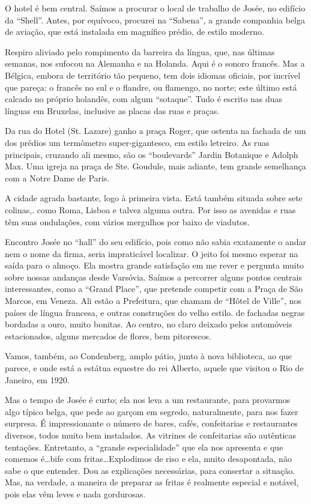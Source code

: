 O hotel é bem central. Saímos a procurar o local de trabalho de Josée, no edifício da ``Shell''. Antes, por equívoco, procurei na ``Sabena'', a grande companhia belga de aviação, que está instalada em magnífico prédio, de estilo moderno.

Respiro aliviado pelo rompimento da barreira da língua, que, nas últimas semanas, nos sufocou na Alemanha e na Holanda. Aqui é o sonoro francês. Mas a Bélgica, embora de território tão pequeno, tem dois idiomas oficiais, por incrível que pareça: o francês no sul e o flandre, ou flamengo, no norte; este último está calcado no próprio holandês, com algum ``sotaque''. Tudo é escrito nas duas línguas em Bruxelas, inclusive as placas das ruas e praças.

Da rua do Hotel (St. Lazare) ganho a praça Roger, que ostenta na fachada de um dos prédios um termômetro super-gigantesco, em estilo letreiro. As ruas principais, cruzando ali mesmo, são os ``boulevards'' Jardin Botanique e Adolph Max. Uma igreja na praça de Ste. Goudule, mais adiante, tem grande semelhança com a Notre Dame de Paris.

A cidade agrada bastante, logo à primeira vista. Está também situada sobre sete colinas,. como Roma, Lisboa e talvez alguma outra. Por isso as avenidas e ruas têm suas ondulações, com vários mergulhos por baixo de viadutos.

Encontro Josée no ``hall'' do seu edifício, pois como não sabia exatamente o andar nem o nome da firma, seria impraticável localizar. O jeito foi mesmo esperar na saída para o almoço. Ela mostra grande satisfação em me rever e pergunta muito sobre nossas andanças desde Varsóvia. Saímos a percorrer alguns pontos centrais interessantes, como a ``Grand Place'', que pretende competir com a Praça de São Marcos, em Veneza. Ali estão a Prefeitura, que chamam de ``Hôtel de Ville'', nos países de língua francesa, e outras construções do velho estilo. de fachadas negras bordadas a ouro, muito bonitas. Ao centro, no claro deixado pelos automóveis estacionados, alguns mercados de flores, bem pitorescos.

Vamos, também, ao Condenberg, amplo pátio, junto à nova biblioteca, ao que parece, e onde está a estátua equestre do rei Alberto, aquele que visitou o Rio de Janeiro, em 1920.

Mas o tempo de Josée é curto; ela nos leva a um restaurante, para provarmos algo típico belga, que pede ao garçom em segredo, naturalmente, para nos fazer surpresa. É impressionante o número de bares, cafés, confeitarias e restaurantes diversos, todos muito bem instalados. As vitrines de confeitarias são autênticas tentações. Entretanto, a ``grande especialidade'' que ela nos apresenta e que comemos é\ldots bife com fritas\ldots Explodimos de riso e ela, muito desapontada, não sabe o que entender. Dou as explicações necessárias, para consertar a situação. Mas, na verdade, a maneira de preparar as fritas é realmente especial e notável, pois elas vêm leves e nada gordurosas.

